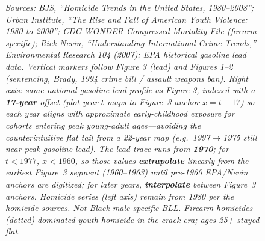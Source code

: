 \documentclass[
]{article}
\begin{document}
\begin{figure}[ht]
\caption*{\emph{Sources: BJS, ``Homicide Trends in the United States, 1980--2008''; Urban Institute, ``The Rise and Fall of American Youth Violence: 1980 to 2000''; CDC WONDER Compressed Mortality File (firearm-specific); Rick Nevin, ``Understanding International Crime Trends,'' \emph{Environmental Research} 104 (2007); EPA historical gasoline lead data. Vertical markers follow Figure 3 (lead) and Figures 1--2 (sentencing, Brady, 1994 crime bill / assault weapons ban). Right axis: same national gasoline-lead profile as Figure 3, indexed with a \textbf{17-year} offset (plot year $t$ maps to Figure~3 anchor $x=t-17$) so each year aligns with approximate early-childhood exposure for cohorts entering peak young-adult ages---avoiding the counterintuitive flat tail from a 22-year map (e.g.\ 1997$\to$1975 still near peak gasoline lead). The lead trace runs from \textbf{1970}; for $t<1977$, $x<1960$, so those values \textbf{extrapolate} linearly from the earliest Figure~3 segment (1960--1963) until pre-1960 EPA/Nevin anchors are digitized; for later years, \textbf{interpolate} between Figure~3 anchors. Homicide series (left axis) remain from 1980 per the homicide sources. Not Black-male-specific BLL. Firearm homicides (dotted) dominated youth homicide in the crack era; ages 25+ stayed flat.}}
\end{figure}
\end{document}
